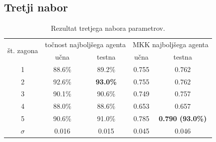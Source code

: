 \subsection{Tretji nabor}\label{subsec:dodatek-statlog-tretji-nabor}
\begin{table}[H]
    \begin{center}
        \begin{tabular}{|| c | c c || c c ||}
            \hline
            \multirow{2}{*}{št. zagona} & \multicolumn{2}{c||}{točnost najboljšega agenta} & \multicolumn{2}{c||}{MKK najboljšega agenta} \\ \cline{2-5}
            & učna   & testna          & učna  & testna                  \\
            \hline
            1        & 88.6\% & 89.2\%          & 0.755 & 0.762                   \\
            \hline
            2        & 92.6\% & \textbf{93.0\%} & 0.755 & 0.762                   \\
            \hline
            3        & 90.1\% & 90.6\%          & 0.749 & 0.757                   \\
            \hline
            4        & 88.0\% & 88.6\%          & 0.653 & 0.657                   \\
            \hline
            5        & 90.6\% & 91.0\%          & 0.785 & \textbf{0.790 (93.0\%)} \\
            \hline
            $\sigma$ & 0.016  & 0.015           & 0.045 & 0.046                   \\
            \hline
        \end{tabular}
    \end{center}
    \caption{Rezultat tretjega nabora parametrov.}
    \label{tab:statlog_result_3}
\end{table}

